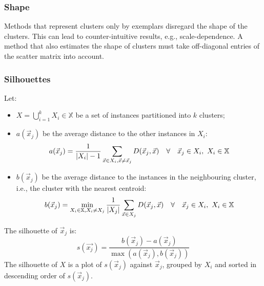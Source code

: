 \subsubsection{Shape}

Methods that represent clusters only by exemplars disregard the shape of the
clusters.
This can lead to counter-intuitive results, e.g., scale-dependence.
A method that also estimates the shape of clusters must take off-diagonal
entries of the scatter matrix into account.

\subsubsection{Silhouettes}

\begin{dfn}
  [Silhouette]
  Let:
  \begin{itemize}
    \item $X = \bigcup_{i = 1}^{k} X_i \in \mathbb{X}$ be a set of instances
          partitioned into $k$ clusters;
    \item $a(\vec{x}_j)$ be the average distance to the other instances in $X_i$:
          \begin{equation}
            a(\vec{x}_j) =
            \frac{1}{|X_i| - 1}
            \sum_{\vec{x} \in X_i, \vec{x} \neq \vec{x}_j} D(\vec{x}_j, \vec{x})
            \quad\forall\quad
            \vec{x}_j \in X_i,\ X_i \in \mathbb{X}
          \end{equation}
    \item $b(\vec{x}_j)$ be the average distance to the instances in the
          neighbouring cluster, i.e., the cluster with the nearest centroid:
          \begin{equation}
            b(\vec{x}_j) =
            \min_{X_i \in \mathbb{X}, X_i \neq X_j}
            \frac{1}{|X_j|}
            \sum_{\vec{x} \in X_j} D(\vec{x}_j, \vec{x})
            \quad\forall\quad
            \vec{x}_j \in X_i,\ X_i \in \mathbb{X}
          \end{equation}
  \end{itemize}
  The silhouette of $\vec{x}_j$ is:
  \begin{equation}
    s(\vec{x_j}) =
    \frac{b(\vec{x}_j) - a(\vec{x}_j)}{\max(a(\vec{x}_j), b(\vec{x}_j))}
  \end{equation}
  The silhouette of $X$ is a plot of $s(\vec{x}_j)$ against
  $\vec{x}_j$, grouped by $X_i$ and sorted in descending order of
  $s(\vec{x}_j)$.
\end{dfn}

